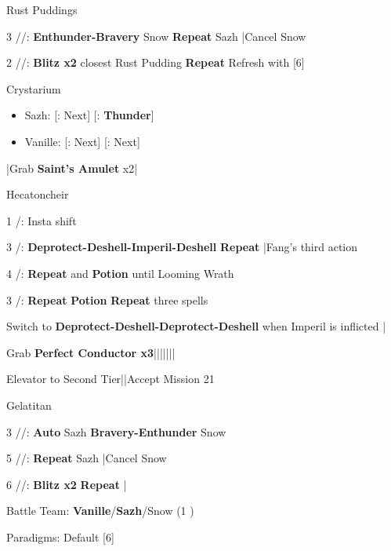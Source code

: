 \begin{fight}{Rust Puddings}
	\item [3] \syn/\med/\com: \textbf{Enthunder-Bravery} Snow \to \textbf{Repeat} Sazh |Cancel Snow
	\item [2] \com/\med/\com: \textbf{Blitz x2} closest Rust Pudding \to \textbf{Repeat} \to Refresh with [6]
\end{fight}
\begin{menu}
	\item Crystarium
	\begin{itemize}
		\item Sazh: [\com: Next] [\rav: \textbf{Thunder}]
		\item Vanille: [\med: Next] [\sab: Next]
	\end{itemize}
\end{menu}
\begin{mainlist}
	\item \skip|Grab \textbf{Saint's Amulet} x2|\skip
\end{mainlist}
\begin{fight}{Hecatoncheir}
	\item [1] \com/\rav: Insta shift
	\item [3] \sab/\com: \textbf{Deprotect-Deshell-Imperil-Deshell} \to \textbf{Repeat} |Fang's third action
	\item [4] \sab/\sen: \textbf{Repeat} and \textbf{Potion} until Looming Wrath
	\item [3] \sab/\com: \textbf{Repeat} \to \textbf{Potion} \to \textbf{Repeat} three spells
	\item Switch to \textbf{Deprotect-Deshell-Deprotect-Deshell} when Imperil is inflicted |\skip
\end{fight}
\begin{mainlist}
	\item Grab \textbf{Perfect Conductor x3}|\skip||||\skip|\skip|\skip
	\item Elevator to Second Tier|\skip|Accept Mission 21
\end{mainlist}
\begin{fight}{Gelatitan}
	\item [3] \syn/\med/\com: \textbf{Auto} Sazh \to \textbf{Bravery-Enthunder} Snow
	\item [5] \syn/\sab/\com: \textbf{Repeat} Sazh |Cancel Snow
	\item [6] \com/\rav/\com: \textbf{Blitz x2} \to \textbf{Repeat} |\skip
\end{fight}
\begin{menu}
	\item Battle Team: \textbf{Vanille}/\textbf{Sazh}/Snow (1 )
	\item Paradigms: Default [6]
\end{menu}
